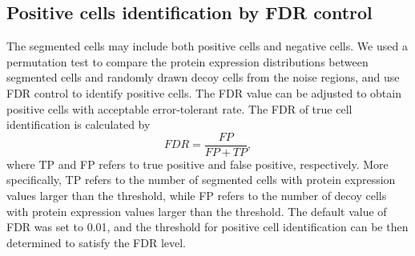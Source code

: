 \documentclass{mynature}
\begin{document}
\subsection{Positive cells identification by FDR control}

The segmented cells may include both positive cells and negative cells. 
We used a permutation test to compare the protein expression distributions between segmented cells and randomly drawn decoy cells from the noise regions, and use FDR control to identify positive cells. The FDR value can be adjusted to obtain positive cells with acceptable error-tolerant rate. 
The FDR of true cell identification is calculated by
\begin{equation}
FDR=\frac{FP}{FP+TP}, 
\end{equation}
where TP and FP refers to true positive and false positive, respectively. 
More specifically, TP refers to the number of segmented cells with protein expression values larger than the threshold, while FP refers to the number of decoy cells with protein expression values larger than the threshold. 
The default value of FDR was set to 0.01, and the threshold for positive cell identification can be then determined to satisfy the FDR level. 

\end{document}
